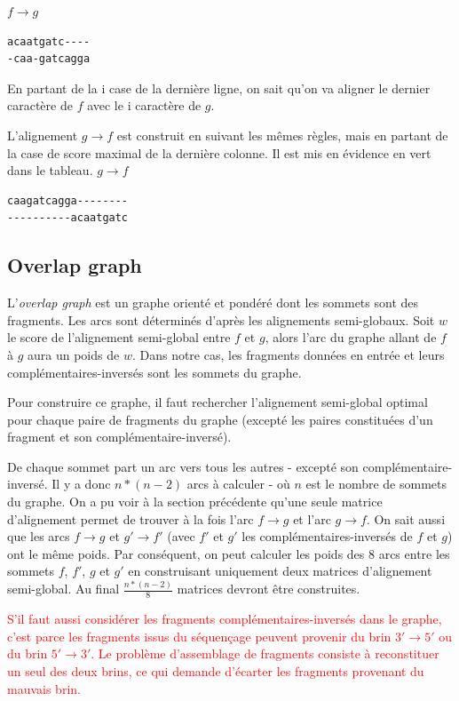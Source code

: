 \documentclass{article}
\begin{document}
$f \to g$
\begin{verbatim}
acaatgatc----
-caa-gatcagga
\end{verbatim}
En partant de la i case de la dernière ligne, on sait qu'on va aligner le dernier caractère de $f$ avec le i caractère de $g$. 

L'alignement $g \to f$ est construit en suivant les mêmes règles, mais en partant de la case de score maximal de la dernière colonne. Il est mis en évidence en vert dans le tableau.
$g \to f$
\begin{verbatim}
caagatcagga--------
----------acaatgatc
\end{verbatim}


\subsection{Overlap graph}

L'\textit{overlap graph} est un graphe orienté et pondéré dont les sommets sont des fragments. Les arcs sont déterminés d'après les alignements semi-globaux. Soit $w$ le score de l'alignement semi-global entre $f$ et $g$, alors l'arc du graphe allant de $f$ à $g$ aura un poids de $w$. Dans notre cas, les fragments données en entrée et leurs complémentaires-inversés sont les sommets du graphe.

Pour construire ce graphe, il faut rechercher l'alignement semi-global optimal pour chaque paire de fragments du graphe (excepté les paires constituées d'un fragment et son complémentaire-inversé).

De chaque sommet part un arc vers tous les autres - excepté son complémentaire-inversé. Il y a donc $n*(n-2)$ arcs à calculer - où $n$ est le nombre de sommets du graphe. On a pu voir à la section précédente qu'une seule matrice d'alignement permet de trouver à la fois l'arc $f\to g$ et l'arc $g \to f$. On sait aussi que les arcs $f \to g$ et $g' \to f'$  (avec $f'$ et $g'$ les complémentaires-inversés de $f$ et $g$) ont le même poids. Par conséquent, on peut calculer les poids des 8 arcs entre les sommets $f$, $f'$, $g$ et $g'$ en construisant uniquement deux matrices d'alignement semi-global. Au final $\frac{n*(n-2)}{8}$ matrices devront être construites.

\textcolor{red}{
S'il faut aussi considérer les fragments complémentaires-inversés dans le graphe, c'est parce les fragments issus du séquençage peuvent provenir du brin $3' \to 5'$ ou du brin $5' \to 3'$. Le problème d'assemblage de fragments consiste à reconstituer un seul des deux brins, ce qui demande d'écarter les fragments provenant du mauvais brin. }
\end{document}
